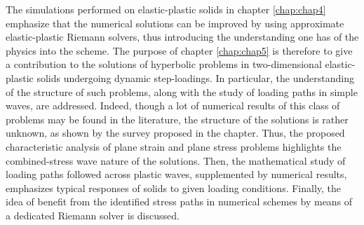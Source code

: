 The simulations performed on elastic-plastic solids in chapter \ref{chap:chap4} emphasize that the numerical solutions can be improved by using approximate elastic-plastic Riemann solvers, thus introducing the understanding one has of the physics into the scheme.
The purpose of chapter \ref{chap:chap5} is therefore to give a contribution to the solutions of hyperbolic problems in two-dimensional elastic-plastic solids undergoing dynamic step-loadings.
In particular, the understanding of the structure of such problems, along with the study of loading paths in simple waves, are addressed. %
Indeed, though a lot of numerical results of this class of problems may be found in the literature, the structure of the solutions is rather unknown, as shown by the survey proposed in the chapter. 
Thus, the proposed characteristic analysis of plane strain and plane stress problems highlights the combined-stress wave nature of the solutions.
Then, the mathematical study of loading paths followed across plastic waves, supplemented by numerical results, emphasizes typical responses of solids to given loading conditions.
Finally, the idea of benefit from the identified stress paths in numerical schemes by means of a dedicated Riemann solver is discussed.


